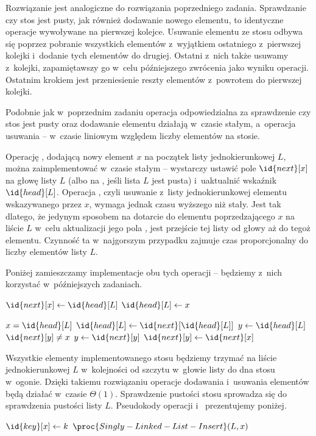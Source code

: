 \exercise %
Rozwiązanie jest analogiczne do rozwiązania poprzedniego zadania. Sprawdzanie czy stos jest pusty, jak również dodawanie nowego elementu, to identyczne operacje wywoływane na pierwszej kolejce. Usuwanie elementu ze stosu odbywa się poprzez pobranie wszystkich elementów z~wyjątkiem ostatniego z~pierwszej kolejki i~dodanie tych elementów do drugiej. Ostatni z~nich także usuwamy z~kolejki, zapamiętawszy go w~celu późniejszego zwrócenia jako wyniku operacji. Ostatnim krokiem jest przeniesienie reszty elementów z~powrotem do pierwszej kolejki.

Podobnie jak w~poprzednim zadaniu operacja odpowiedzialna za sprawdzenie czy stos jest pusty oraz dodawanie elementu działają w~czasie stałym, a~operacja usuwania -- w~czasie liniowym względem liczby elementów na stosie.


\exercise %
Operację , dodającą nowy element $x$ na początek listy jednokierunkowej $L$, można zaimplementować w~czasie stałym -- wystarczy ustawić pole $\id{next}[x]$ na głowę listy $L$ (albo na , jeśli lista $L$ jest pusta) i~uaktualnić wskaźnik $\id{head}[L]$. Operacja , czyli usuwanie z~listy jednokierunkowej elementu wskazywanego przez $x$, wymaga jednak czasu wyższego niż stały. Jest tak dlatego, że jedynym sposobem na dotarcie do elementu poprzedzającego $x$ na liście $L$ w~celu aktualizacji jego pola , jest przejście tej listy od głowy aż do tegoż elementu. Czynność ta w~najgorszym przypadku zajmuje czas proporcjonalny do liczby elementów listy $L$.

Poniżej zamieszczamy implementacje obu tych operacji -- będziemy z~nich korzystać w~późniejszych zadaniach.
\begin{codebox}
\li	$\id{next}[x]\gets\id{head}[L]$
\li	$\id{head}[L]\gets x$
\end{codebox}

\begin{codebox}
\li	\If $x=\id{head}[L]$
\li		\Then $\id{head}[L]\gets\id{next}[\id{head}[L]]$
\li		\Else
			$y\gets\id{head}[L]$
\li			\While $\id{next}[y]\ne x$
\li				\Do $y\gets\id{next}[y]$
				\End
\li			$\id{next}[y]\gets\id{next}[x]$
		\End
\end{codebox}

\exercise %
Wszystkie elementy implementowanego stosu będziemy trzymać na liście jednokierunkowej $L$ w~kolejności od szczytu w~głowie listy do dna stosu w~ogonie. Dzięki takiemu rozwiązaniu operacje dodawania i~usuwania elementów będą działać w~czasie $\Theta(1)$. Sprawdzenie pustości stosu sprowadza się do sprawdzenia pustości listy $L$. Pseudokody operacji  i~ prezentujemy poniżej.
\begin{codebox}
\li	$\id{key}[x]\gets k$
\li $\proc{Singly-Linked-List-Insert}(L,x)$
\end{codebox}


